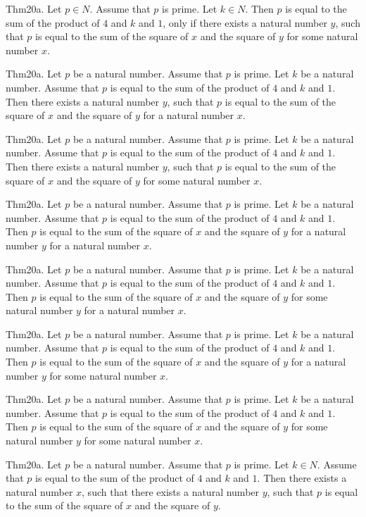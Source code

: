 \documentclass{article}
\begin{document}
Thm20a. Let $p \in N$. Assume that $p$ is prime. Let $k \in N$. Then $p$ is equal to the sum of the product of $4$ and $k$ and $1$, only if there exists a natural number $y$, such that $p$ is equal to the sum of the square of $x$ and the square of $y$ for some natural number $x$.

Thm20a. Let $p$ be a natural number. Assume that $p$ is prime. Let $k$ be a natural number. Assume that $p$ is equal to the sum of the product of $4$ and $k$ and $1$. Then there exists a natural number $y$, such that $p$ is equal to the sum of the square of $x$ and the square of $y$ for a natural number $x$.

Thm20a. Let $p$ be a natural number. Assume that $p$ is prime. Let $k$ be a natural number. Assume that $p$ is equal to the sum of the product of $4$ and $k$ and $1$. Then there exists a natural number $y$, such that $p$ is equal to the sum of the square of $x$ and the square of $y$ for some natural number $x$.

Thm20a. Let $p$ be a natural number. Assume that $p$ is prime. Let $k$ be a natural number. Assume that $p$ is equal to the sum of the product of $4$ and $k$ and $1$. Then $p$ is equal to the sum of the square of $x$ and the square of $y$ for a natural number $y$ for a natural number $x$.

Thm20a. Let $p$ be a natural number. Assume that $p$ is prime. Let $k$ be a natural number. Assume that $p$ is equal to the sum of the product of $4$ and $k$ and $1$. Then $p$ is equal to the sum of the square of $x$ and the square of $y$ for some natural number $y$ for a natural number $x$.

Thm20a. Let $p$ be a natural number. Assume that $p$ is prime. Let $k$ be a natural number. Assume that $p$ is equal to the sum of the product of $4$ and $k$ and $1$. Then $p$ is equal to the sum of the square of $x$ and the square of $y$ for a natural number $y$ for some natural number $x$.

Thm20a. Let $p$ be a natural number. Assume that $p$ is prime. Let $k$ be a natural number. Assume that $p$ is equal to the sum of the product of $4$ and $k$ and $1$. Then $p$ is equal to the sum of the square of $x$ and the square of $y$ for some natural number $y$ for some natural number $x$.

Thm20a. Let $p$ be a natural number. Assume that $p$ is prime. Let $k \in N$. Assume that $p$ is equal to the sum of the product of $4$ and $k$ and $1$. Then there exists a natural number $x$, such that there exists a natural number $y$, such that $p$ is equal to the sum of the square of $x$ and the square of $y$.
\end{document}
